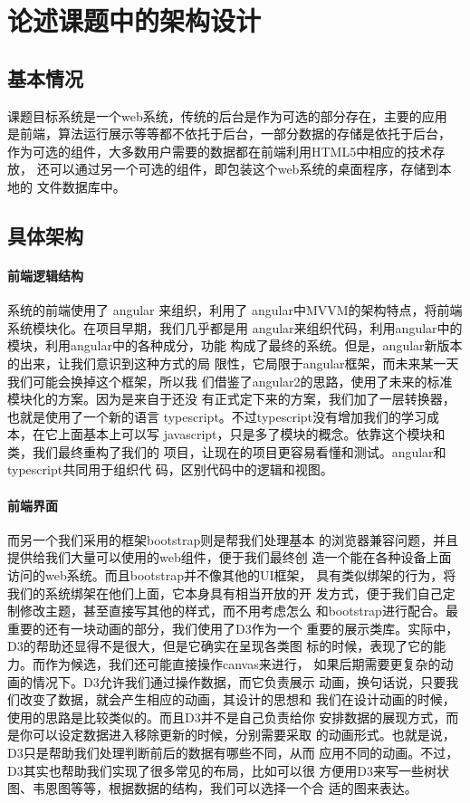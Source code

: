 \section{论述课题中的架构设计}
\subsection{基本情况}
课题目标系统是一个web系统，传统的后台是作为可选的部分存在，主要的应用
是前端，算法运行展示等等都不依托于后台，一部分数据的存储是依托于后台，
作为可选的组件，大多数用户需要的数据都在前端利用HTML5中相应的技术存放，
还可以通过另一个可选的组件，即包装这个web系统的桌面程序，存储到本地的
文件数据库中。
\subsection{具体架构}
\paragraph{前端逻辑结构} 系统的前端使用了 angular 来组织，利用了
angular中MVVM的架构特点，将前端系统模块化。在项目早期，我们几乎都是用
angular来组织代码，利用angular中的模块，利用angular中的各种成分，功能
构成了最终的系统。但是，angular新版本的出来，让我们意识到这种方式的局
限性，它局限于angular框架，而未来某一天我们可能会换掉这个框架，所以我
们借鉴了angular2的思路，使用了未来的标准模块化的方案。因为是来自于还没
有正式定下来的方案，我们加了一层转换器，也就是使用了一个新的语言
typescript。不过typescript没有增加我们的学习成本，在它上面基本上可以写
javascript，只是多了模块的概念。依靠这个模块和类，我们最终重构了我们的
项目，让现在的项目更容易看懂和测试。angular和typescript共同用于组织代
码，区别代码中的逻辑和视图。
\paragraph{前端界面} 而另一个我们采用的框架bootstrap则是帮我们处理基本
的浏览器兼容问题，并且提供给我们大量可以使用的web组件，便于我们最终创
造一个能在各种设备上面访问的web系统。而且bootstrap并不像其他的UI框架，
具有类似绑架的行为，将我们的系统绑架在他们上面，它本身具有相当开放的开
发方式，便于我们自己定制修改主题，甚至直接写其他的样式，而不用考虑怎么
和bootstrap进行配合。最重要的还有一块动画的部分，我们使用了D3作为一个
重要的展示类库。实际中，D3的帮助还显得不是很大，但是它确实在呈现各类图
标的时候，表现了它的能力。而作为候选，我们还可能直接操作canvas来进行，
如果后期需要更复杂的动画的情况下。D3允许我们通过操作数据，而它负责展示
动画，换句话说，只要我们改变了数据，就会产生相应的动画，其设计的思想和
我们在设计动画的时候，使用的思路是比较类似的。而且D3并不是自己负责给你
安排数据的展现方式，而是你可以设定数据进入移除更新的时候，分别需要采取
的动画形式。也就是说，D3只是帮助我们处理判断前后的数据有哪些不同，从而
应用不同的动画。不过，D3其实也帮助我们实现了很多常见的布局，比如可以很
方便用D3来写一些树状图、韦恩图等等，根据数据的结构，我们可以选择一个合
适的图来表达。
